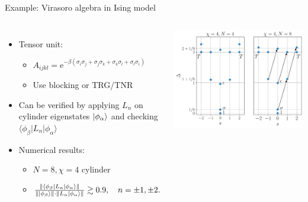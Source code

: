 \documentclass{fdubeamer}
\newcommand{\ee}{\mathrm{e}}
\newcommand{\1}{\mathbb{1}}
\begin{document}
\begin{frame}{Example: Virasoro algebra in Ising model}

\begin{columns}[T]


    \begin{itemize}
      \item Tensor unit:

        \begin{itemize}
          \item $A_{ijkl} = \ee^{-\beta (\sigma_i\sigma_j + \sigma_j\sigma_k + \sigma_k\sigma_l + \sigma_l\sigma_i)}$
          \item Use blocking or TRG/TNR
        \end{itemize}

      \item Can be verified by applying $L_n$ on cylinder eigenstates $\ket{\phi_\alpha}$ and checking $\langle\phi_\beta|L_n|\phi_\alpha\rangle$
      \item Numerical results:

        \begin{itemize}
          \item $N=8, \chi=4$ cylinder \\[1ex]
          \item $
              \frac{\lVert \langle\phi_\beta|L_n|\phi_\alpha\rangle \rVert}{\lVert \ket*{\phi_\beta} \rVert \cdot \lVert L_n\ket*{\phi_\alpha} \rVert} \gtrsim 0.9, \quad
              n=\pm1, \pm2.
            $
        \end{itemize}
    \end{itemize}


    \vspace{1em}
    \includegraphics[width=\textwidth]{images/virasoro/ising-spectrum.pdf}

\end{columns}


\end{frame}
\end{document}
